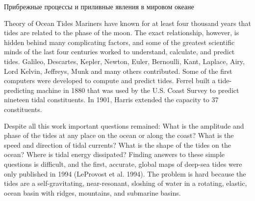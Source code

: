 \begin{chapter}{Прибрежные процессы и приливные явления в мировом океане}
\begin{section}{Theory of Ocean Tides}
Mariners have known for at least four thousand years that tides are
related to the phase of the moon. The exact relationship,
however, is hidden behind many complicating factors, and some of the
greatest scientific minds of the last four centuries worked to
understand, calculate, and predict tides. Galileo, Descartes, Kepler,
Newton, Euler, Bernoulli, Kant, Laplace, Airy, Lord Kelvin, Jeffreys,
Munk and many others contributed. Some of the first computers were
developed to compute and predict tides. Ferrel built a tide-predicting
machine in 1880 that was used by the U.S. Coast Survey to predict
nineteen tidal constituents. In 1901, Harris extended the capacity to
37 constituents.
%

Despite all this work important questions remained: What is the
amplitude and phase of the tides at any place on the ocean or along
the coast? What is the speed and direction of tidal currents?  What is
the shape of the tides on the ocean?  Where is tidal energy
dissipated? Finding answers to these simple questions is difficult,
and the first, accurate, global maps of deep-sea tides were only
published in 1994 (LeProvost et al. 1994). The problem is hard because
the tides are a self-gravitating, near-resonant, sloshing of water in
a rotating, elastic, ocean basin with ridges, mountains, and submarine
basins.
%


\end{section}
\end{chapter}
